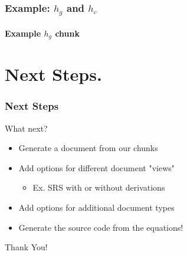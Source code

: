 \documentclass{beamer}
\begin{document}

\begin{frame}

\frametitle{Example: $h_g$ and $h_c$}

\framesubtitle{Example $h_g$ chunk}
\lstset{basicstyle = \footnotesize}


\end{frame}


\section[Next Steps]{Next Steps.}


\begin{frame}

\frametitle{Next Steps}


\begin{Large}
What next?
\end{Large}

\begin{itemize}
\item Generate a document from our chunks
\item Add options for different document "views"
\begin{itemize}
\item Ex. SRS with or without derivations
\end{itemize}
\item Add options for additional document types
\item Generate the source code from the equations!
\end{itemize}
\end{frame}


\begin{frame}
\begin{center}
\Huge Thank You!
\end{center}
\end{frame}

\end{document}
